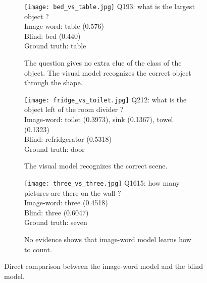 \begin{figure}
    \centering
    \footnotesize
    \begin{subfigure}[t]{0.3\textwidth}
            \texttt{[image: bed\_vs\_table.jpg]}
            Q193: what is the largest object ?\\
            Image-word: table (0.576)\\
            Blind: bed (0.440)\\
            Ground truth: table
            \caption{The question gives no extra clue of the class of the object. The visual model recognizes the correct object through the shape.}
    \end{subfigure}%
    \quad
    \begin{subfigure}[t]{0.3\textwidth}
            \texttt{[image: fridge\_vs\_toilet.jpg]}
            Q212: what is the object left of the room divider ?\\
            Image-word: toilet (0.3973), sink (0.1367), towel (0.1323)\\
            Blind: refridgerator (0.5318)\\
            Ground truth: door
            \caption{The visual model recognizes the correct scene.}
    \end{subfigure}
    \quad
    \begin{subfigure}[t]{0.3\textwidth}
            \texttt{[image: three\_vs\_three.jpg]}
            Q1615: how many pictures are there on the wall ?\\
            Image-word: three (0.4518)\\
            Blind: three (0.6047)\\
            Ground truth: seven
            \caption{No evidence shows that image-word model learns how to count.}
    \end{subfigure}
    \caption{Direct comparison between the image-word model and the blind model.}
    \label{fig:imgword+blind}
\end{figure}

